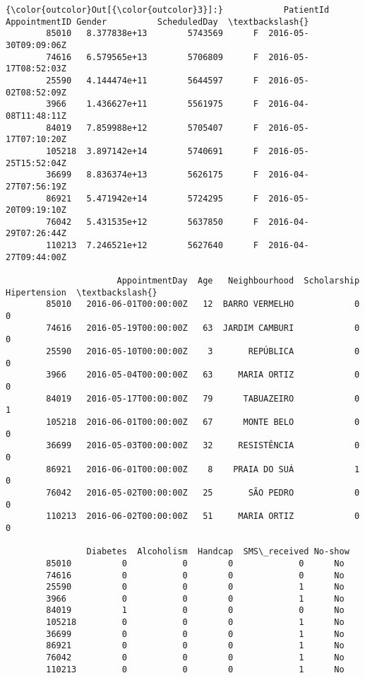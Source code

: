 \documentclass[11pt]{article}
\begin{document}
\begin{Verbatim}[commandchars=\\\{\}]
{\color{outcolor}Out[{\color{outcolor}3}]:}            PatientId  AppointmentID Gender          ScheduledDay  \textbackslash{}
        85010   8.377838e+13        5743569      F  2016-05-30T09:09:06Z   
        74616   6.579565e+13        5706809      F  2016-05-17T08:52:03Z   
        25590   4.144474e+11        5644597      F  2016-05-02T08:52:09Z   
        3966    1.436627e+11        5561975      F  2016-04-08T11:48:11Z   
        84019   7.859988e+12        5705407      F  2016-05-17T07:10:20Z   
        105218  3.897142e+14        5740691      F  2016-05-25T15:52:04Z   
        36699   8.836374e+13        5626175      F  2016-04-27T07:56:19Z   
        86921   5.471942e+14        5724295      F  2016-05-20T09:19:10Z   
        76042   5.431535e+12        5637850      F  2016-04-29T07:26:44Z   
        110213  7.246521e+12        5627640      F  2016-04-27T09:44:00Z   
        
                      AppointmentDay  Age   Neighbourhood  Scholarship  Hipertension  \textbackslash{}
        85010   2016-06-01T00:00:00Z   12  BARRO VERMELHO            0             0   
        74616   2016-05-19T00:00:00Z   63  JARDIM CAMBURI            0             0   
        25590   2016-05-10T00:00:00Z    3       REPÚBLICA            0             0   
        3966    2016-05-04T00:00:00Z   63     MARIA ORTIZ            0             0   
        84019   2016-05-17T00:00:00Z   79      TABUAZEIRO            0             1   
        105218  2016-06-01T00:00:00Z   67      MONTE BELO            0             0   
        36699   2016-05-03T00:00:00Z   32     RESISTÊNCIA            0             0   
        86921   2016-06-01T00:00:00Z    8    PRAIA DO SUÁ            1             0   
        76042   2016-05-02T00:00:00Z   25       SÃO PEDRO            0             0   
        110213  2016-06-02T00:00:00Z   51     MARIA ORTIZ            0             0   
        
                Diabetes  Alcoholism  Handcap  SMS\_received No-show  
        85010          0           0        0             0      No  
        74616          0           0        0             0      No  
        25590          0           0        0             1      No  
        3966           0           0        0             1      No  
        84019          1           0        0             0      No  
        105218         0           0        0             1      No  
        36699          0           0        0             1      No  
        86921          0           0        0             1      No  
        76042          0           0        0             1      No  
        110213         0           0        0             1      No  
\end{Verbatim}
            
\end{document}
